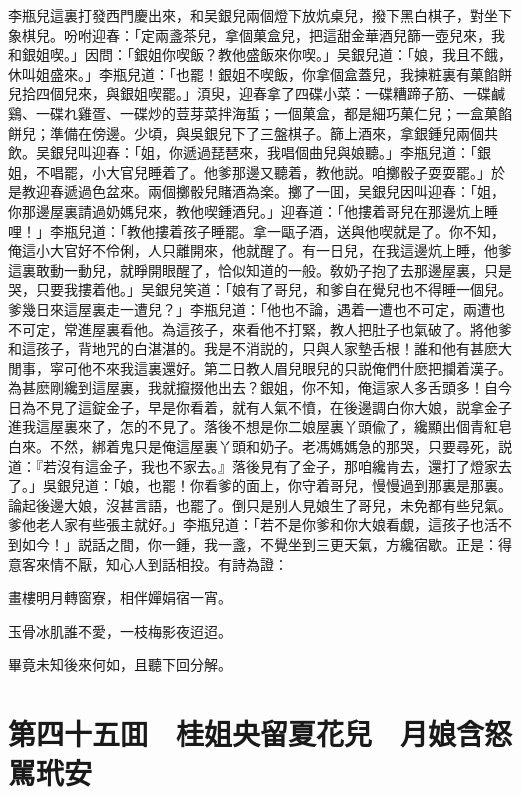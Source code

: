 李瓶兒這裏打發西門慶出來，和吴銀兒兩個燈下放炕桌兒，撥下黑白棋子，對坐下象棋兒。吩咐迎春：「定兩盞茶兒，拿個菓盒兒，把這甜金華酒兒篩一壺兒來，我和銀姐喫。」因問：「銀姐你喫飯？教他盛飯來你喫。」吴銀兒道：「娘，我且不餓，休叫姐盛來。」李瓶兒道：「也罷！銀姐不喫飯，你拿個盒蓋兒，我揀粧裏有菓餡餅兒拾四個兒來，與銀姐喫罷。」湏臾，迎春拿了四碟小菜：一碟糟蹄子筋、一碟鹹鷄、一碟れ雞疍、一碟炒的荳芽菜拌海蜇；一個菓盒，都是細巧菓仁兒；一盒菓餡餅兒；準備在傍邊。少頃，與吳銀兒下了三盤棋子。篩上酒來，拿銀鍾兒兩個共飲。吴銀兒叫迎春：「姐，你遞過琵琶來，我唱個曲兒與娘聽。」李瓶兒道：「銀姐，不唱罷，小大官兒睡着了。他爹那邊又聽着，教他説。咱擲骰子耍耍罷。」於是教迎春遞過色盆來。兩個擲骰兒賭酒為楽。擲了一囬，吴銀兒因叫迎春：「姐，你那邊屋裏請過奶媽兒來，教他喫鍾酒兒。」迎春道：「他摟着哥兒在那邊炕上睡哩！」李瓶兒道：「教他摟着孩子睡罷。拿一甌子酒，送與他喫就是了。你不知，俺這小大官好不伶俐，人只離開來，他就醒了。有一日兒，在我這邊炕上睡，他爹這裏敢動一動兒，就睜開眼醒了，恰似知道的一般。敎奶子抱了去那邊屋裏，只是哭，只要我摟着他。」吴銀兒笑道：「娘有了哥兒，和爹自在覺兒也不得睡一個兒。爹幾日來這屋裏走一遭兒？」李瓶兒道：「他也不論，遇着一遭也不可定，兩遭也不可定，常進屋裏看他。為這孩子，來看他不打緊，教人把肚子也氣破了。將他爹和這孩子，背地咒的白湛湛的。我是不消説的，只與人家墊舌根！誰和他有甚麽大閒事，寜可他不來我這裏還好。第二日教人眉兒眼兒的只説俺們什麽把攔着漢子。為甚麽剛纔到這屋裏，我就攛掇他出去？銀姐，你不知，俺這家人多舌頭多！自今日為不見了這錠金子，早是你看着，就有人氣不憤，在後邊調白你大娘，説拿金子進我這屋裏來了，怎的不見了。落後不想是你二娘屋裏丫頭偸了，纔顯出個青紅皂白來。不然，綁着鬼只是俺這屋裏丫頭和奶子。老馮媽媽急的那哭，只要尋死，説道：『若沒有這金子，我也不家去。』落後見有了金子，那咱纔肯去，還打了燈家去了。」吳銀兒道：「娘，也罷！你看爹的面上，你守着哥兒，慢慢過到那裏是那裏。論起後邊大娘，沒甚言語，也罷了。倒只是别人見娘生了哥兒，未免都有些兒氣。爹他老人家有些張主就好。」李瓶兒道：「若不是你爹和你大娘看覷，這孩子也活不到如今！」説話之間，你一鍾，我一盞，不覺坐到三更天氣，方纔宿歇。正是：得意客來情不厭，知心人到話相投。有詩為證：

畫樓明月轉窗寮，相伴嬋娟宿一宵。

玉骨冰肌誰不愛，一枝梅影夜迢迢。

畢竟未知後來何如，且聽下回分解。

\chapter*{第四十五囬　桂姐央留夏花兒　月娘含怒駡玳安}

